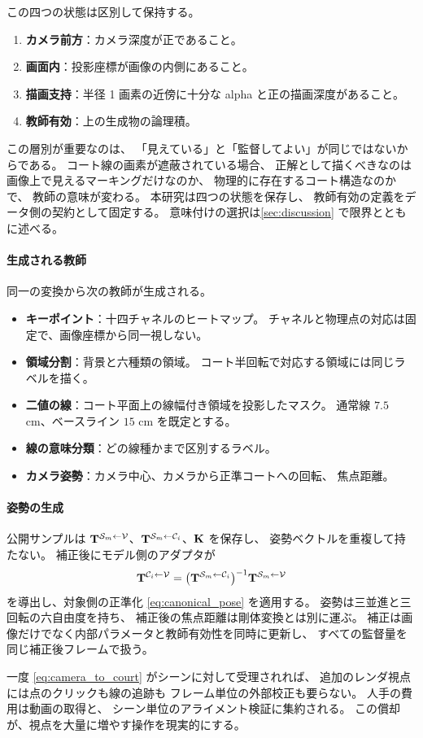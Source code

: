 この四つの状態は区別して保持する。

\begin{enumerate}[leftmargin=1.6em]
  \item \textbf{カメラ前方}：カメラ深度が正であること。
  \item \textbf{画面内}：投影座標が画像の内側にあること。
  \item \textbf{描画支持}：半径 1 画素の近傍に十分な alpha と正の描画深度があること。
  \item \textbf{教師有効}：上の生成物の論理積。
\end{enumerate}

この層別が重要なのは、
「見えている」と「監督してよい」が同じではないからである。
コート線の画素が遮蔽されている場合、
正解として描くべきなのは画像上で見えるマーキングだけなのか、
物理的に存在するコート構造なのかで、
教師の意味が変わる。
本研究は四つの状態を保存し、
教師有効の定義をデータ側の契約として固定する。
意味付けの選択は\cref{sec:discussion} で限界とともに述べる。

\paragraph{生成される教師}
同一の変換から次の教師が生成される。

\begin{itemize}[leftmargin=1.6em]
  \item \textbf{キーポイント}：十四チャネルのヒートマップ。
  チャネルと物理点の対応は固定で、画像座標から同一視しない。
  \item \textbf{領域分割}：背景と六種類の領域。
  コート半回転で対応する領域には同じラベルを描く。
  \item \textbf{二値の線}：コート平面上の線幅付き領域を投影したマスク。
  通常線 \(7.5\) cm、ベースライン \(15\) cm を既定とする。
  \item \textbf{線の意味分類}：どの線種かまで区別するラベル。
  \item \textbf{カメラ姿勢}：カメラ中心、カメラから正準コートへの回転、
  焦点距離。
\end{itemize}

\paragraph{姿勢の生成}
公開サンプルは
\(\mathbf{T}^{\mathcal{S}_m\leftarrow \mathcal{V}}\)、\(\mathbf{T}^{\mathcal{S}_m\leftarrow \mathcal{C}_i}\)、\(\mathbf{K}\) を保存し、
姿勢ベクトルを重複して持たない。
補正後にモデル側のアダプタが
\begin{equation}
  \mathbf{T}^{\mathcal{C}_i\leftarrow \mathcal{V}}=
  \bigl(\mathbf{T}^{\mathcal{S}_m\leftarrow \mathcal{C}_i}\bigr)^{-1}\mathbf{T}^{\mathcal{S}_m\leftarrow \mathcal{V}}
  \label{eq:camera_to_court}
\end{equation}
を導出し、対象側の正準化 \cref{eq:canonical_pose} を適用する。
姿勢は三並進と三回転の六自由度を持ち、
補正後の焦点距離は剛体変換とは別に運ぶ。
補正は画像だけでなく内部パラメータと教師有効性を同時に更新し、
すべての監督量を同じ補正後フレームで扱う。

一度 \cref{eq:camera_to_court} がシーンに対して受理されれば、
追加のレンダ視点には点のクリックも線の追跡も
フレーム単位の外部校正も要らない。
人手の費用は動画の取得と、
シーン単位のアライメント検証に集約される。
この償却が、視点を大量に増やす操作を現実的にする。
